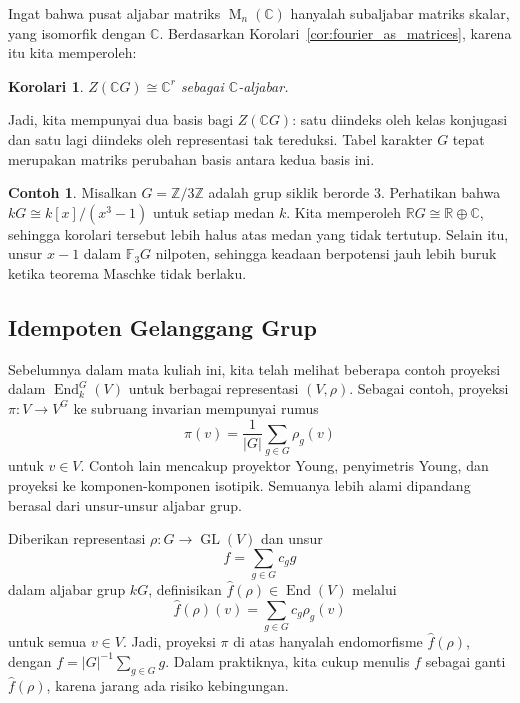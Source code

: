 \documentclass[12pt]{article}
\theoremstyle{plain}
\newtheorem{corollary}[theorem]{Korolari}
\theoremstyle{definition}
\newtheorem{example}[theorem]{Contoh}
\theoremstyle{remark}
\numberwithin{equation}{section}
\begin{document}
Ingat bahwa pusat aljabar matriks
$\operatorname{M}_n(\mathbb{C})$ hanyalah subaljabar matriks
skalar, yang isomorfik dengan $\mathbb{C}$.
Berdasarkan Korolari~\ref{cor:fourier_as_matrices}, karena itu kita
memperoleh:

\begin{corollary} \label{cor:CGcenter}
$\displaystyle Z(\mathbb{C}G) \cong \mathbb{C}^r$
sebagai $\mathbb{C}$-aljabar.
\end{corollary}

Jadi, kita mempunyai dua basis bagi $Z(\mathbb{C}G)$: satu diindeks oleh kelas
konjugasi dan satu lagi diindeks oleh representasi tak tereduksi.
Tabel karakter $G$ tepat merupakan matriks perubahan basis antara
kedua basis ini.

\begin{example}
Misalkan $G = \mathbb{Z}/3\mathbb{Z}$ adalah grup siklik berorde $3$.
Perhatikan bahwa $kG \cong k[x]/(x^3-1)$ untuk setiap medan $k$.
Kita memperoleh $\mathbb{R}G \cong \mathbb{R} \oplus \mathbb{C}$,
sehingga korolari tersebut lebih halus atas medan yang tidak tertutup.
Selain itu, unsur $x-1$ dalam $\mathbb{F}_3G$ nilpoten,
sehingga keadaan berpotensi jauh lebih buruk ketika teorema Maschke
tidak berlaku.
\end{example}

\subsection{Idempoten Gelanggang Grup}

Sebelumnya dalam mata kuliah ini, kita telah melihat beberapa contoh proyeksi dalam
$\operatorname{End}_k^G(V)$ untuk berbagai representasi $(V,\rho)$.
Sebagai contoh, proyeksi $\pi : V \to V^G$ ke subruang
invarian mempunyai rumus
\[
\pi(v) = \frac{1}{|G|} \sum_{g \in G} \rho_g(v)
\]
untuk $v \in V$.
Contoh lain mencakup proyektor Young, penyimetris Young,
dan proyeksi ke komponen-komponen isotipik.
Semuanya lebih alami dipandang berasal dari unsur-unsur
aljabar grup.

Diberikan representasi $\rho : G \to \operatorname{GL}(V)$
dan unsur
\[
f = \sum_{g \in G} c_g g
\]
dalam aljabar grup $kG$,
definisikan $\widehat{f}(\rho) \in \operatorname{End}(V)$ melalui
\[
\widehat{f}(\rho)(v) = \sum_{g \in G} c_g \rho_g(v)
\]
untuk semua $v \in V$.
Jadi, proyeksi $\pi$ di atas hanyalah endomorfisme
$\widehat{f}(\rho)$,
dengan $f = |G|^{-1} \sum_{g \in G} g$.
Dalam praktiknya, kita cukup menulis $f$ sebagai ganti $\widehat{f}(\rho)$,
karena jarang ada risiko kebingungan.
\end{document}
